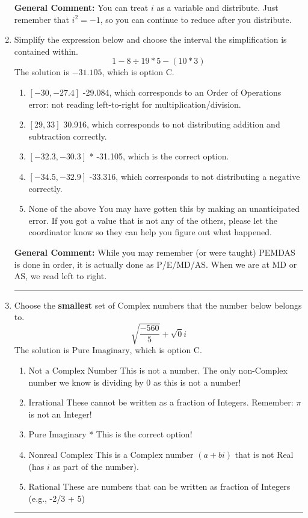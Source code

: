 \documentclass{extbook}[14pt]
\newcommand{\litem}[1]{\item #1

\rule{\textwidth}{0.4pt}}
\begin{document}
\begin{enumerate}
{\textbf{General Comment:} You can treat $i$ as a variable and distribute. Just remember that $i^2=-1$, so you can continue to reduce after you distribute.
}
\litem{
Simplify the expression below and choose the interval the simplification is contained within.
\[ 1 - 8 \div 19 * 5 - (10 * 3) \]
The solution is \( -31.105 \), which is option C.\begin{enumerate}[label=\Alph*.]
\item \( [-30, -27.4] \)
 -29.084, which corresponds to an Order of Operations error: not reading left-to-right for multiplication/division.
\item \( [29, 33] \)
 30.916, which corresponds to not distributing addition and subtraction correctly.
\item \( [-32.3, -30.3] \)
* -31.105, which is the correct option.
\item \( [-34.5, -32.9] \)
 -33.316, which corresponds to not distributing a negative correctly.
\item \( \text{None of the above} \)
 You may have gotten this by making an unanticipated error. If you got a value that is not any of the others, please let the coordinator know so they can help you figure out what happened.
\end{enumerate}

\textbf{General Comment:} While you may remember (or were taught) PEMDAS is done in order, it is actually done as P/E/MD/AS. When we are at MD or AS, we read left to right.
}
\litem{
Choose the \textbf{smallest} set of Complex numbers that the number below belongs to.
\[ \sqrt{\frac{-560}{5}}+\sqrt{0}i \]
The solution is \( \text{Pure Imaginary} \), which is option C.\begin{enumerate}[label=\Alph*.]
\item \( \text{Not a Complex Number} \)
This is not a number. The only non-Complex number we know is dividing by 0 as this is not a number!
\item \( \text{Irrational} \)
These cannot be written as a fraction of Integers. Remember: $\pi$ is not an Integer!
\item \( \text{Pure Imaginary} \)
* This is the correct option!
\item \( \text{Nonreal Complex} \)
This is a Complex number $(a+bi)$ that is not Real (has $i$ as part of the number).
\item \( \text{Rational} \)
These are numbers that can be written as fraction of Integers (e.g., -2/3 + 5)
\end{enumerate}

}
\end{enumerate}
\end{document}
